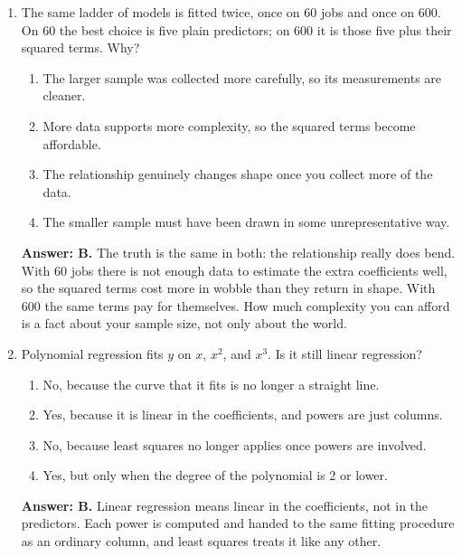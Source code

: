 \documentclass[11pt]{article}
\begin{document}
\begin{enumerate}[itemsep=14pt]
\item The same ladder of models is fitted twice, once on 60 jobs and once on 600. On 60 the best choice is five plain predictors; on 600 it is those five plus their squared terms. Why?

\begin{enumerate}[label=\Alph*., itemsep=1pt, topsep=3pt]
  \item The larger sample was collected more carefully, so its measurements are cleaner.
  \item More data supports more complexity, so the squared terms become affordable.
  \item The relationship genuinely changes shape once you collect more of the data.
  \item The smaller sample must have been drawn in some unrepresentative way.
\end{enumerate}

\vspace{2pt}
\textbf{Answer: B.} The truth is the same in both: the relationship really does bend. With 60 jobs there is not enough data to estimate the extra coefficients well, so the squared terms cost more in wobble than they return in shape. With 600 the same terms pay for themselves. How much complexity you can afford is a fact about your sample size, not only about the world.
\vspace{4pt}

\item Polynomial regression fits $y$ on $x$, $x^2$, and $x^3$. Is it still linear regression?

\begin{enumerate}[label=\Alph*., itemsep=1pt, topsep=3pt]
  \item No, because the curve that it fits is no longer a straight line.
  \item Yes, because it is linear in the coefficients, and powers are just columns.
  \item No, because least squares no longer applies once powers are involved.
  \item Yes, but only when the degree of the polynomial is 2 or lower.
\end{enumerate}

\vspace{2pt}
\textbf{Answer: B.} Linear regression means linear in the coefficients, not in the predictors. Each power is computed and handed to the same fitting procedure as an ordinary column, and least squares treats it like any other.
\vspace{4pt}


\end{enumerate}
\end{document}
